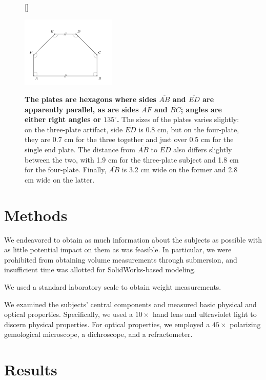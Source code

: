 \documentclass[10pt]{article}
\theoremstyle{definition}
\begin{document}
\begin{figure}
[\FBwidth]
{\caption{\label{fig:plate}\textbf{The plates are hexagons where sides $\overline{AB}$ and $\overline{ED}$ are apparently parallel, as are sides $\overline{AF}$ and $\overline{BC}$; angles are either right angles or $135^\circ$.} The sizes of the plates varies slightly: on the three-plate artifact, side $\overline{ED}$ is 0.8 cm, but on the four-plate, they are 0.7 cm for the three together and just over 0.5 cm for the single end plate. The distance from $\overline{AB}$ to $\overline{ED}$ also differs slightly between the two, with 1.9 cm for the three-plate subject and 1.8 cm for the four-plate. Finally, $\overline{AB}$ is 3.2 cm wide on the former and 2.8 cm wide on the latter.}}
{\includegraphics[width=0.4\textwidth]{plate.pdf}}
\end{figure}

\section{Methods}
We endeavored to obtain as much information about the subjects as possible with as little potential impact on them as was feasible.
In particular, we were prohibited from obtaining volume measurements through submersion, and insufficient time was allotted for SolidWorks-based modeling.

We used a standard laboratory scale to obtain weight measurements.

We examined the subjects' central components and measured basic physical and optical properties.
Specifically, we used a $10\times$ hand lens and ultraviolet light to discern physical properties.
For optical properties, we employed a $45\times$ polarizing gemological microscope, a dichroscope, and a refractometer.

\section{Results}
\end{document}
